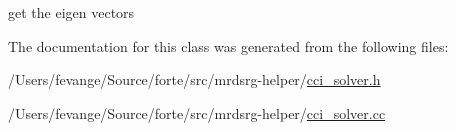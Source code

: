 get the eigen vectors 



The documentation for this class was generated from the following files\+:\begin{DoxyCompactItemize}
\item 
/\+Users/fevange/\+Source/forte/src/mrdsrg-\/helper/\mbox{\hyperlink{cci__solver_8h}{cci\+\_\+solver.\+h}}\item 
/\+Users/fevange/\+Source/forte/src/mrdsrg-\/helper/\mbox{\hyperlink{cci__solver_8cc}{cci\+\_\+solver.\+cc}}\end{DoxyCompactItemize}
